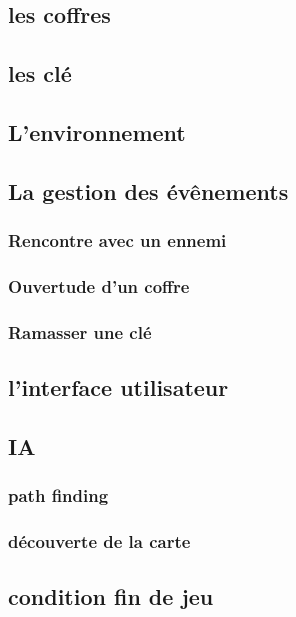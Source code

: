 \documentclass[a4paper 12pts]{article}
\begin{document}
\subsection{les coffres}


\subsection{les clé}


\subsection{L'environnement}


\subsection{La gestion des évênements}


\subsubsection {Rencontre avec un ennemi} 


\subsubsection {Ouvertude d'un coffre}


\subsubsection {Ramasser une clé}

 
\subsection{l'interface utilisateur}

\subsection{IA}

\subsubsection{path finding}

\subsubsection{découverte de la carte}

\subsection{condition fin de jeu}
\end{document}
